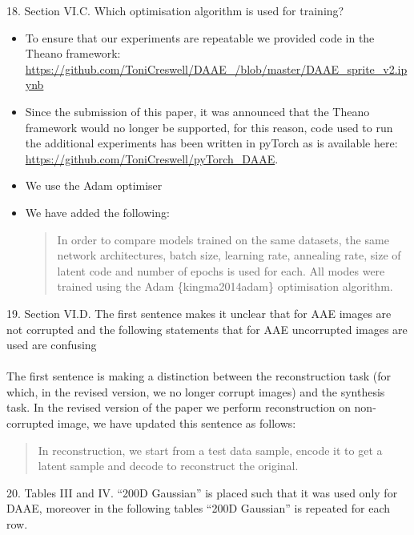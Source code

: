 \documentclass[a4paper,11pt]{article}
\begin{document}
{\color{blue}
18. Section VI.C. Which optimisation algorithm is used for training?}\\

\begin{itemize}
    \item To ensure that our experiments are repeatable we provided code in the Theano framework: \url{https://github.com/ToniCreswell/DAAE_/blob/master/DAAE_sprite_v2.ipynb}
    \item Since the submission of this paper, it was announced that the Theano framework would no longer be supported, for this reason, code used to run the additional experiments has been written in pyTorch as is available here: \url{https://github.com/ToniCreswell/pyTorch_DAAE}.
    \item We use the Adam optimiser
    \item We have added the following:
    \begin{quote}
        {\color{red} In order to compare models trained on the same datasets, the same network architectures, batch size, learning rate, annealing rate, size of latent code and number of epochs is used for each. All modes were trained using the Adam \{kingma2014adam\} optimisation algorithm.}
    \end{quote}
\end{itemize}

{\color{blue}
19. Section VI.D. The first sentence makes it unclear that for AAE images are not corrupted and the following statements that for AAE uncorrupted images are used are confusing\\
}\\

The first sentence is making a distinction between the reconstruction task (for which, in the revised version, we no longer corrupt images) and the synthesis task. In the revised version of the paper we perform reconstruction on non-corrupted image, we have updated this sentence as follows:

\begin{quote}
{\color{red} In reconstruction, we start from a test data sample, encode it to get a latent sample and decode to reconstruct the original. }
\end{quote}


{\color{blue}
20. Tables III and IV. ``200D Gaussian'' is placed such that it was used only for DAAE, moreover in the following tables ``200D Gaussian'' is repeated for each row.\\
}
\end{document}
